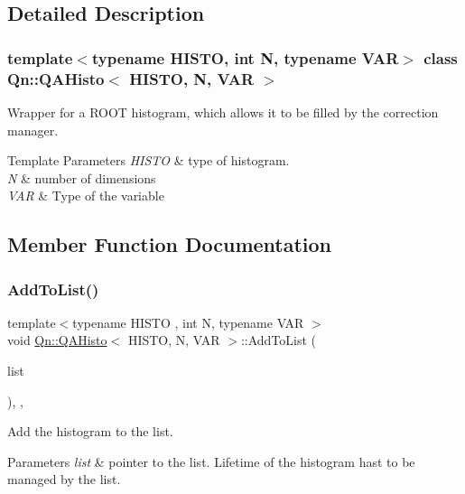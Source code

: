\subsection{Detailed Description}
\subsubsection*{template$<$typename H\+I\+S\+TO, int N, typename V\+AR$>$\newline
class Qn\+::\+Q\+A\+Histo$<$ H\+I\+S\+T\+O, N, V\+A\+R $>$}

Wrapper for a R\+O\+OT histogram, which allows it to be filled by the correction manager. 
\begin{DoxyTemplParams}{Template Parameters}
{\em H\+I\+S\+TO} & type of histogram. \\
\hline
{\em N} & number of dimensions \\
\hline
{\em V\+AR} & Type of the variable \\
\hline
\end{DoxyTemplParams}


\subsection{Member Function Documentation}
\mbox{\label{classQn_1_1QAHisto_a3d5c6dde0416609c37bfc847955e0b8d}} 
\subsubsection{\texorpdfstring{Add\+To\+List()}{AddToList()}}
{\footnotesize\ttfamily template$<$typename H\+I\+S\+TO , int N, typename V\+AR $>$ \\
void \mbox{\hyperlink{classQn_1_1QAHisto}{Qn\+::\+Q\+A\+Histo}}$<$ H\+I\+S\+TO, N, V\+AR $>$\+::Add\+To\+List (\begin{DoxyParamCaption}\item[{T\+List $\ast$}]{list }\end{DoxyParamCaption})\hspace{0.3cm}{\ttfamily [inline]}, {\ttfamily [override]}, {\ttfamily [virtual]}}

Add the histogram to the list. 
\begin{DoxyParams}{Parameters}
{\em list} & pointer to the list. Lifetime of the histogram hast to be managed by the list. \\
\hline
\end{DoxyParams}


